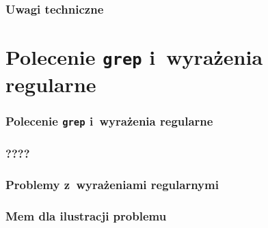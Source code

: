 \documentclass[10pt,t]{beamer}
\begin{document}
\begin{frame}
  \frametitle{Uwagi techniczne}




\end{frame}










\section{Polecenie \texttt{grep} i~wyrażenia regularne}


\begin{frame}
  \frametitle{Polecenie \texttt{grep} i~wyrażenia regularne}




\end{frame}





\begin{frame}
  \frametitle{????}





\end{frame}





\begin{frame}
  \frametitle{}



\end{frame}




\begin{frame}
  \frametitle{Problemy z~wyrażeniami regularnymi}




\end{frame}





\begin{frame}
  \frametitle{Mem dla ilustracji problemu}



\end{frame}
\end{document}

